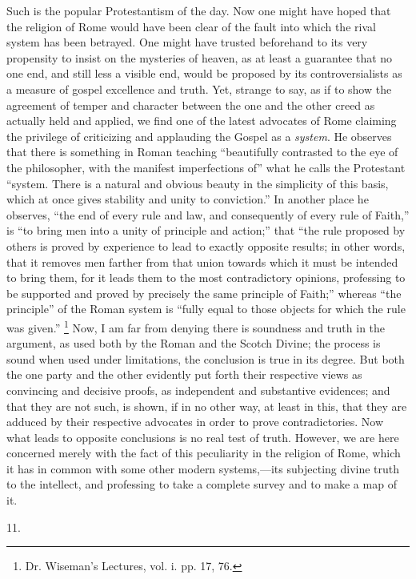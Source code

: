 Such is the popular Protestantism of the day. Now one might have
hoped that the religion of Rome would have been clear of the fault
into which the rival system has been betrayed. One might have trusted
beforehand to its very propensity to insist on the mysteries of
heaven, as at least a guarantee that no one end, and still less
a visible end, would be proposed by its controversialists as a measure
of gospel excellence and truth. Yet, strange to say, as if to show the
agreement of temper and character between the one and the other creed
as actually held and applied, we find one of the latest advocates of
Rome claiming the privilege of criticizing and applauding the Gospel
as a \emph{system}. He observes that there is something in Roman
teaching ``beautifully contrasted to the eye of the philosopher,
with the manifest imperfections of'' what he calls the Protestant
``system. There is a natural and obvious beauty in the simplicity
of this basis, which at once gives stability and unity to
conviction.'' In another place he observes, ``the end of every
rule and law, and consequently of every rule of Faith,'' is
``to bring men into a unity of principle and action;'' that
``the rule proposed by others is proved by experience to lead to
exactly opposite results; in other words, that it removes men farther
from that union towards which it must be intended to bring them, for
it leads them to the most contradictory opinions, professing to be
supported and proved by precisely the same principle of Faith;''
whereas ``the principle'' of the Roman system is ``fully
equal to those objects for which the rule was given.'' \footnote{Dr. Wiseman's Lectures, vol. i. pp. 17,
76.} Now, I am far from denying there is soundness and truth in the
argument, as used both by the Roman and the Scotch Divine; the process
is sound when used under limitations, the conclusion is true in its
degree. But both the one party and the other evidently put forth their
respective views as convincing and decisive proofs, as independent and
substantive evidences; and that they are not such, is shown, if in no
other way, at least in this, that they are adduced by their respective
advocates in order to prove contradictories. Now what leads to
opposite conclusions is no real test of truth. However, we are here concerned merely with the fact of this peculiarity in the
religion of Rome, which it has in common with some other modern
systems,—its subjecting divine truth to the intellect, and
professing to take a complete survey and to make a map of it.

11.

